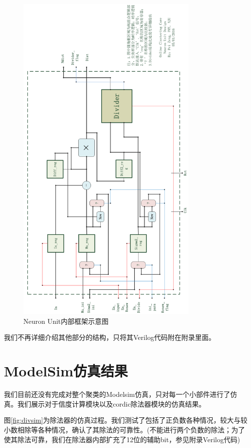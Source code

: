 \begin{figure}[p]
   \centering
   \includegraphics[width=0.8\textwidth]{NeuronUnitLarge.png} %
   \caption{Neuron Unit内部框架示意图}
   \label{fig:neuronunitlarge}
\end{figure}

我们不再详细介绍其他部分的结构，只将其Verilog代码附在附录里面。

\section{ModelSim仿真结果}
我们目前还没有完成对整个聚类的Modelsim仿真，只对每一个小部件进行了仿真。我们展示对于信度计算模块以及cordic除法器模块的仿真结果。

图\ref{fig:divsim}为除法器的仿真过程。我们测试了包括了正负数各种情况，较大与较小数相除等各种情况，确认了其除法的可靠性。(不能进行两个负数的除法；为了使其除法可靠，我们在除法器内部扩充了12位的辅助bit，参见附录Verilog代码)

